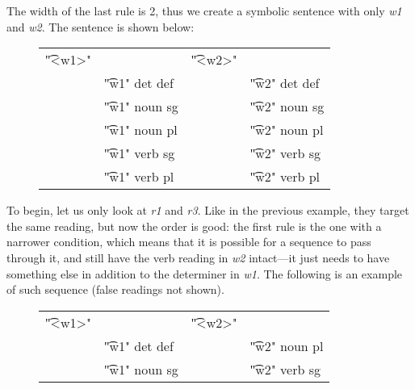\noindent The width of the last rule is 2, thus we create a symbolic sentence with only {\em w1} and {\em w2}. The sentence is shown below:

\begin{figure}[h]
\centering 
\begin{tabular}{p{0.6cm} l  p{0.6cm} l }
\t{"<w1>"}    &                     &  \t{"<w2>"}  &           \\
              & \t{"w1" det def}    & &      \t{"w2" det def}  \\
              & \t{"w1" noun sg}    & &      \t{"w2" noun sg}  \\
              & \t{"w1" noun pl}    & &      \t{"w2" noun pl}  \\
              & \t{"w1" verb sg}    & &      \t{"w2" verb sg}  \\
              & \t{"w1" verb pl}    & &      \t{"w2" verb pl}  \\
\end{tabular}
\end{figure}


To begin, let us only look at {\em r1} and {\em r3}. Like in the previous example, they target the same reading, but now the order is good: the first rule is the one with a narrower condition, which means that it is possible for a sequence to pass through it, and still have the verb reading in {\em w2} intact---it just needs to have something else in addition to the determiner in {\em w1}.
The following is an example of such sequence (false readings not shown). %

\begin{figure}[h]
\centering
\begin{tabular}{p{0.6cm} l  p{0.6cm} l }
\t{"<w1>"}    &                     &  \t{"<w2>"}  &           \\
              & \t{"w1" det def}    & &      \t{"w2" noun pl}  \\
              & \t{"w1" noun sg}    & &      \t{"w2" verb sg}  \\
\end{tabular}
\end{figure}


